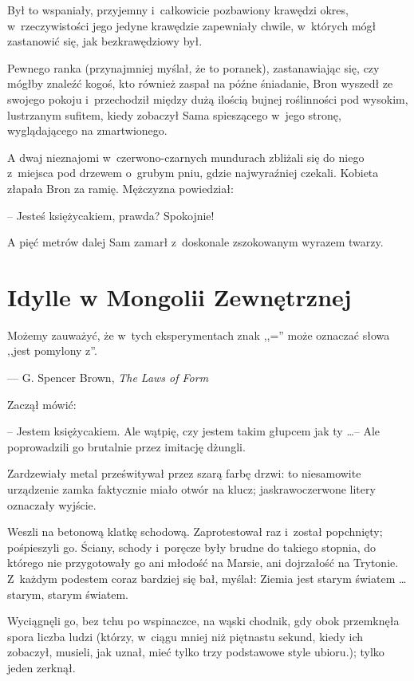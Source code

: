 \documentclass[oneside,polish,11pt,rmheadings]{mwbk}
\begin{document}
Był to wspaniały, przyjemny i~całkowicie pozbawiony krawędzi okres, w~rzeczywistości jego jedyne krawędzie zapewniały chwile, w~których mógł zastanowić się, jak bezkrawędziowy był. 

Pewnego ranka (przynajmniej myślał, że to poranek), zastanawiając się, czy mógłby znaleźć kogoś, kto również zaspał na późne śniadanie, Bron wyszedł ze swojego pokoju i~przechodził między dużą ilością bujnej roślinności pod wysokim, lustrzanym sufitem, kiedy zobaczył Sama spieszącego w~jego stronę, wyglądającego na zmartwionego. 

A dwaj nieznajomi w~czerwono-czarnych mundurach zbliżali się do niego z~miejsca pod drzewem o~grubym pniu, gdzie najwyraźniej czekali. Kobieta złapała Bron za ramię. Mężczyzna powiedział: 

-- Jesteś księżycakiem, prawda? Spokojnie! 

A pięć metrów dalej Sam zamarł z~doskonale zszokowanym wyrazem twarzy. 

\chapter{Idylle w Mongolii Zewnętrznej}

Możemy zauważyć, że w~tych eksperymentach znak ,,='' może oznaczać słowa ,,jest pomylony z''. 

\smallskip
\noindent --- G. Spencer Brown, \textit{The Laws of Form }

\bigskip
Zaczął mówić: 

-- Jestem księżycakiem. Ale wątpię, czy jestem takim głupcem jak ty \ldots  -- Ale poprowadzili go brutalnie przez imitację dżungli. 

Zardzewiały metal prześwitywał przez szarą farbę drzwi: to niesamowite urządzenie zamka faktycznie miało otwór na klucz; jaskrawoczerwone litery oznaczały wyjście. 

Weszli na betonową klatkę schodową. Zaprotestował raz i~został popchnięty; pośpieszyli go. Ściany, schody i~poręcze były brudne do takiego stopnia, do którego nie przygotowały go ani młodość na Marsie, ani dojrzałość na Trytonie. Z~każdym podestem coraz bardziej się bał, myślał: Ziemia jest starym światem \ldots  starym, starym światem. 

Wyciągnęli go, bez tchu po wspinaczce, na wąski chodnik, gdy obok przemknęła spora liczba ludzi (którzy, w~ciągu mniej niż piętnastu sekund, kiedy ich zobaczył, musieli, jak uznał, mieć tylko trzy podstawowe style ubioru.); tylko jeden zerknął. 
\end{document}
